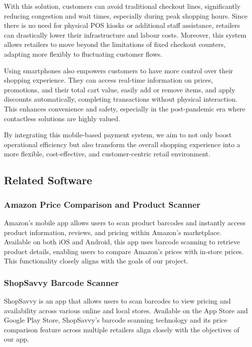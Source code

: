 \documentclass[conference]{IEEEtran}
\begin{document}
With this solution, customers can avoid traditional checkout lines, significantly reducing congestion and wait times, especially during peak shopping hours. Since there is no need for physical POS kiosks or additional staff assistance, retailers can drastically lower their infrastructure and labour costs. Moreover, this system allows retailers to move beyond the limitations of fixed checkout counters, adapting more flexibly to fluctuating customer flows. 

Using smartphones also empowers customers to have more control over their shopping experience. They can access real-time information on prices, promotions, and their total cart value, easily add or remove items, and apply discounts automatically, completing transactions without physical interaction. This enhances convenience and safety, especially in the post-pandemic era where contactless solutions are highly valued. 

By integrating this mobile-based payment system, we aim to not only boost operational efficiency but also transform the overall shopping experience into a more flexible, cost-effective, and customer-centric retail environment. 

\subsection{Related Software}

\subsubsection{Amazon Price Comparison and Product Scanner}
Amazon’s mobile app allows users to scan product barcodes and instantly access product information, reviews, and pricing within Amazon’s marketplace. Available on both iOS and Android, this app uses barcode scanning to retrieve product details, enabling users to compare Amazon’s prices with in-store prices. This functionality closely aligns with the goals of our project.

\subsubsection{ShopSavvy Barcode Scanner}
ShopSavvy is an app that allows users to scan barcodes to view pricing and availability across various online and local stores. Available on the App Store and Google Play Store, ShopSavvy’s barcode scanning technology and its price comparison feature across multiple retailers align closely with the objectives of our app.
\end{document}
